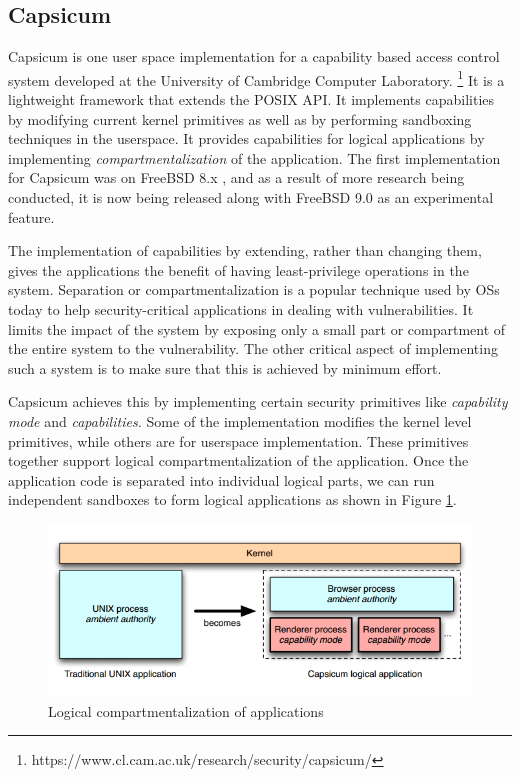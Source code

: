\subsection{Capsicum}
\label{subsec:capsicum}

Capsicum is one user space implementation for a capability based access control system developed at the University of Cambridge Computer Laboratory. \footnote{https://www.cl.cam.ac.uk/research/security/capsicum/} It is a lightweight framework that extends the POSIX API. It implements capabilities by modifying current kernel primitives as well as by performing sandboxing techniques in the userspace. It provides capabilities for logical applications by implementing \textit{compartmentalization} of the application. The first implementation for Capsicum was on FreeBSD 8.x \cite{watson2010capsicum}, and as a result of more research being conducted, it is now being released along with FreeBSD 9.0 as an experimental feature.

The implementation of capabilities by extending, rather than changing them, gives the applications the benefit of having least-privilege operations in the system. Separation or compartmentalization is a popular technique used by OSs today to help security-critical applications in dealing with vulnerabilities. It limits the impact of the system by exposing only a small part or compartment of the entire system to the vulnerability. The other critical aspect of implementing such a system is to make sure that this is achieved by minimum effort.

Capsicum achieves this by implementing certain security primitives like \textit{capability mode} and \textit{capabilities.} Some of the implementation modifies the kernel level primitives, while others are for userspace implementation. These primitives together support logical compartmentalization of the application. Once the application code is separated into individual logical parts, we can run independent sandboxes to form logical applications as shown in Figure \ref{compartment}.

\begin{figure}[t]
\centering
\includegraphics[scale=0.39]{img/capcisum_sandbox}
\caption{Logical compartmentalization of applications}
\label{compartment}
\end{figure}

